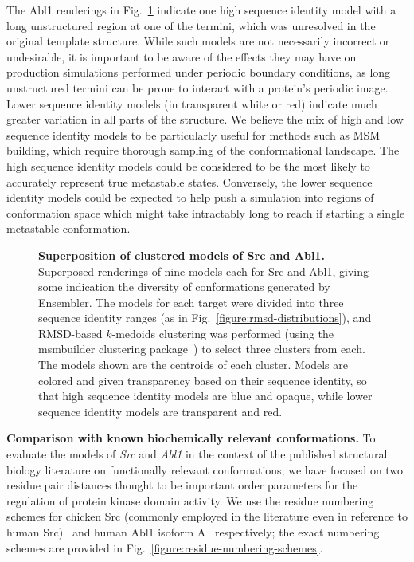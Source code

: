 \documentclass[aps,prl,preprint,nofootinbib,superscriptaddress,linenumbers]{revtex4-1}
\begin{document}
The Abl1 renderings in Fig.~\ref{figure:superposition} indicate one high sequence identity model with a long unstructured region at one of the termini, which was unresolved in the original template structure.
While such models are not necessarily incorrect or undesirable, it is important to be aware of the effects they may have on production simulations performed under periodic boundary conditions, as long unstructured termini can be prone to interact with a protein's periodic image.
Lower sequence identity models (in transparent white or red) indicate much greater variation in all parts of the structure.
We believe the mix of high and low sequence identity models to be particularly useful for methods such as MSM building, which require thorough sampling of the conformational landscape.
The high sequence identity models could be considered to be the most likely to accurately represent true metastable states.
Conversely, the lower sequence identity models could be expected to help push a simulation into regions of conformation space which might take intractably long to reach if starting a single metastable conformation.


\begin{figure}[tb]
    
    \caption{{\bf Superposition of clustered models of Src and Abl1.}
    Superposed renderings of nine models each for Src and Abl1, 
    giving some indication the diversity of conformations generated by Ensembler.
    The models for each target were divided into three sequence identity ranges (as in Fig.~\ref{figure:rmsd-distributions}), and RMSD-based $k$-medoids clustering was performed (using the msmbuilder clustering package~\cite{msmbuilder}) to select three clusters from each.
    The models shown are the centroids of each cluster.
    Models are colored and given transparency based on their sequence identity, so that high sequence identity models are blue and opaque, while lower sequence identity models are transparent and red.
  \label{figure:superposition}
  }
\end{figure}

{\bf Comparison with known biochemically relevant conformations.}
To evaluate the models of \emph{Src} and \emph{Abl1} in the context of the published structural biology literature on functionally relevant conformations, we have focused on two residue pair distances thought to be important order parameters for the regulation of protein kinase domain activity.
We use the residue numbering schemes for chicken Src (commonly employed in the literature even in reference to human Src)~\cite{xu:1999:2src, cowan-jacob:2005:1y57} and human Abl1 isoform A~\cite{young:2006:2f4j, cowan-jacob:2006:2hyy, levinson:2006:2g1t} respectively; the exact numbering schemes are provided in Fig.~\ref{figure:residue-numbering-schemes}.
\end{document}
